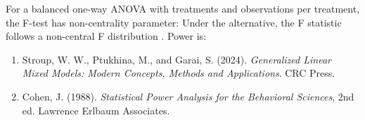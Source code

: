 \documentclass[a4paper]{book}
\begin{document}
%
\begin{Details}
For a balanced one-way ANOVA with  treatments and 
observations per treatment, the F-test has non-centrality parameter:
Under the alternative, the F statistic follows a non-central
F distribution .  Power is:
\end{Details}
%
\begin{References}
\begin{enumerate}

\item{} Stroup, W. W., Ptukhina, M., and Garai, S. (2024).
\emph{Generalized Linear Mixed Models: Modern Concepts, Methods and
Applications}. CRC Press.
\item{} Cohen, J. (1988).
\emph{Statistical Power Analysis for the Behavioral Sciences},
2nd ed. Lawrence Erlbaum Associates.

\end{enumerate}

\end{References}
%
\begin{SeeAlso}
\end{SeeAlso}
%
\end{document}
